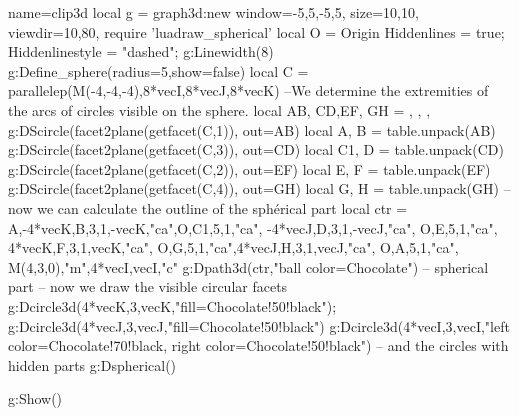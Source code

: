 \documentclass[border=5pt]{standalone}
\begin{document}
\begin{luadraw}{name=clip3d}
    local g = graph3d:new{
        window={-5,5,-5,5},
        size={10,10},
        viewdir={10,80},
    }
    require 'luadraw_spherical'
    local O = Origin
    Hiddenlines = true; Hiddenlinestyle = "dashed"; g:Linewidth(8)
    g:Define_sphere({radius=5,show=false})
    local C = parallelep(M(-4,-4,-4),8*vecI,8*vecJ,8*vecK)
    --We determine the extremities of the arcs of circles visible on the sphere.
    local AB, CD,EF, GH = {}, {}, {}, {}
    g:DScircle(facet2plane(getfacet(C,1)), {out=AB})
    local A, B = table.unpack(AB)
    g:DScircle(facet2plane(getfacet(C,3)), {out=CD})
    local C1, D = table.unpack(CD)
    g:DScircle(facet2plane(getfacet(C,2)), {out=EF})
    local E, F = table.unpack(EF)
    g:DScircle(facet2plane(getfacet(C,4)), {out=GH})
    local G, H = table.unpack(GH)
    -- now we can calculate the outline of the sphérical part
    local ctr = {A,-4*vecK,B,3,1,-vecK,"ca",O,C1,5,1,"ca", -4*vecJ,D,3,1,-vecJ,"ca", O,E,5,1,"ca", 4*vecK,F,3,1,vecK,"ca", O,G,5,1,"ca",4*vecJ,H,3,1,vecJ,"ca", O,A,5,1,"ca", M(4,3,0),"m",4*vecI,vecI,"c"}
    g:Dpath3d(ctr,"ball color=Chocolate") -- spherical part
    -- now we draw the visible circular facets
    g:Dcircle3d(4*vecK,3,vecK,"fill=Chocolate!50!black"); 
    g:Dcircle3d(4*vecJ,3,vecJ,"fill=Chocolate!50!black")
    g:Dcircle3d(4*vecI,3,vecI,"left color=Chocolate!70!black, right color=Chocolate!50!black")
    -- and the circles with hidden parts
    g:Dspherical()

    g:Show()
\end{luadraw}
\end{document}

